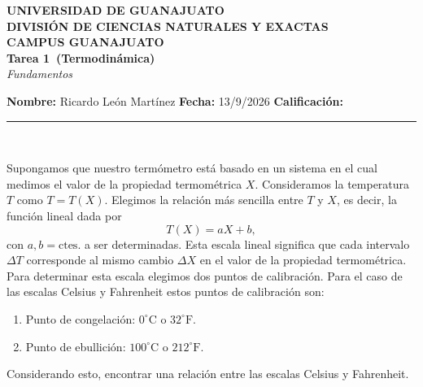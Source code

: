 \documentclass[12pt,a4paper]{article}
\newcommand{\alumno}{Ricardo León Martínez}
\newcommand{\materia}{Termodinámica}
\newcommand{\tarea}{Tarea 1}
\newcommand{\fecha}{13/9/2026}
\begin{document}
    \begin{center}
    {\large\textbf{UNIVERSIDAD DE GUANAJUATO}}\\[0.3cm]
    {\normalsize\textbf{DIVISIÓN DE CIENCIAS NATURALES Y EXACTAS}}\\
    {\normalsize\textbf{CAMPUS GUANAJUATO}}\\[1cm]

    {\Large\textbf{\tarea\ (\materia)}}\\[0.2cm]
    {\normalsize\textit{Fundamentos}}\\[1cm]
    \end{center}

    \textbf{Nombre:} \alumno \hfill
    \textbf{Fecha:} \fecha \hfill
    \textbf{Calificación:} \rule{3cm}{0.4pt} \\[0.3cm]

    \begin{problema}
        Supongamos que nuestro termómetro está basado en un sistema en el cual medimos el
        valor de la propiedad termométrica $X$. Consideramos la temperatura $T$ como $T=T(X)$.
        Elegimos la relación más sencilla entre $T$ y $X$, es decir, la función lineal dada por
        \begin{equation*}
            T(X)=aX+b,
        \end{equation*}
        con $a,b=\text{ctes.}$ a ser determinadas. Esta escala lineal significa que cada
        intervalo $\Delta T$ corresponde al mismo cambio $\Delta X$ en el valor de la propiedad
        termométrica. Para determinar esta escala elegimos dos puntos de calibración. Para el
        caso de las escalas Celsius y Fahrenheit estos puntos de calibración son:
        \begin{enumerate}
            \item[1.] Punto de congelación: $0^{\circ}\text{C}$ o $32^{\circ}\text{F}$.
            \item[2.] Punto de ebullición: $100^{\circ}\text{C}$ o $212^{\circ}\text{F}$.
        \end{enumerate}
        Considerando esto, encontrar una relación entre las escalas Celsius y Fahrenheit.
    \end{problema}
\end{document}
